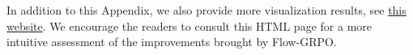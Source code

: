 \documentclass{article}
\begin{document}
In addition to this Appendix, we also provide more visualization results, see \href{https://gongyeliu.github.io/Flow-GRPO/}{this website}. We encourage the readers to consult this HTML page for a more intuitive assessment of the improvements brought by Flow-GRPO.

\clearpage



%  

% 

% 

%   
\end{document}
